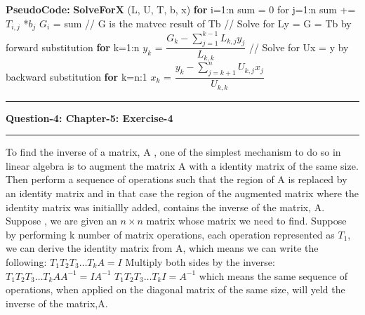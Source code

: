 \documentclass{article}
\newcommand\question[2]{\vspace{.25in}\hrule\textbf{#1: #2}\hrule\vspace{.10in}}
\newcommand\pseudoCode{\vspace{.10in}\textbf{PseudoCode: }}
\begin{document}
\pseudoCode \newline
\hspace*{0.5cm} \textbf {SolveForX} (L, U, T, b, x) \newline
\hspace*{1cm}       \textbf {for} i=1:n \newline
 \hspace*{1.5cm}       sum = 0 \newline
 \hspace*{1.5cm}       for j=1:n \newline
  \hspace*{2cm}              sum +=$ T_{i,j}$ *$ b_{j}$ \newline
 \hspace*{1.5cm}      $G_{i}$ = sum \newline
 \hspace*{1cm}    // G is the matvec result of Tb \newline
 \hspace*{1cm}   // Solve for Ly = G = Tb by forward substitution \newline
 \hspace*{1cm}   \textbf {for} k=1:n \newline
 \hspace*{1.5cm}    $y_{k}$ = $\dfrac{G_{k} - \sum_{j=1}^{k-1}L_{k,j}y_{j}}{L_{k,k}}$ \newline
\hspace*{1cm}  // Solve for Ux = y by backward substitution \newline
\hspace*{1cm}   \textbf {for} k=n:1 \newline
\hspace*{1.5cm}   $x_{k}$ = $\dfrac{y_{k} - \sum_{j=k+1}^n U_{k,j}x_{j}}{U_{k,k}}$

  
  \question{Question-4}{Chapter-5: Exercise-4}
To find the inverse of a matrix, A , one of the simplest mechanism to do so in linear algebra is to augment the matrix A with a identity matrix of the same size. Then perform a sequence of operations such that the region of A is replaced by an identity matrix and in that case the region of the augmented matrix where the identity matrix was initiallly added, contains the inverse of the matrix, A. \newline
Suppose , we are given an $n \times n$ matrix whose matrix we need to find. Suppose by performing k number of matrix operations, each operation represented as $T_{1}$, we can derive the identity matrix from A, which means we can write the following: \newline
$T_{1}T_{2}T_{3} \dots T_{k} A = I$ \newline
Multiply both sides by the inverse: \newline
$T_{1}T_{2}T_{3} \dots T_{k} A A^{-1}= IA^{-1}$ \newline
$T_{1}T_{2}T_{3} \dots T_{k} I= A^{-1}$ \newline
which means the same sequence of operations, when applied on the diagonal matrix of the same size, will yeld the inverse of the matrix,A. \newline
\end{document}
